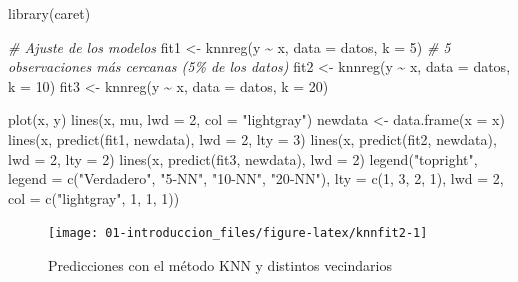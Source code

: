 \documentclass[
]{book}
\newenvironment{Shaded}{\begin{snugshade}}{\end{snugshade}}
\newcommand{\AttributeTok}[1]{\textcolor[rgb]{0.77,0.63,0.00}{#1}}
\newcommand{\CommentTok}[1]{\textcolor[rgb]{0.56,0.35,0.01}{\textit{#1}}}
\newcommand{\DecValTok}[1]{\textcolor[rgb]{0.00,0.00,0.81}{#1}}
\newcommand{\FunctionTok}[1]{\textcolor[rgb]{0.00,0.00,0.00}{#1}}
\newcommand{\NormalTok}[1]{#1}
\newcommand{\OtherTok}[1]{\textcolor[rgb]{0.56,0.35,0.01}{#1}}
\newcommand{\SpecialCharTok}[1]{\textcolor[rgb]{0.00,0.00,0.00}{#1}}
\newcommand{\StringTok}[1]{\textcolor[rgb]{0.31,0.60,0.02}{#1}}
\theoremstyle{break}
\theoremstyle{definition}
\theoremstyle{definition}
\theoremstyle{definition}
\theoremstyle{definition}
\theoremstyle{remark}
\begin{document}
\begin{Shaded}
\begin{Highlighting}[]
\FunctionTok{library}\NormalTok{(caret)}

\CommentTok{\# Ajuste de los modelos}
\NormalTok{fit1 }\OtherTok{\textless{}{-}} \FunctionTok{knnreg}\NormalTok{(y }\SpecialCharTok{\textasciitilde{}}\NormalTok{ x, }\AttributeTok{data =}\NormalTok{ datos, }\AttributeTok{k =} \DecValTok{5}\NormalTok{) }\CommentTok{\# 5 observaciones más cercanas (5\% de los datos)}
\NormalTok{fit2 }\OtherTok{\textless{}{-}} \FunctionTok{knnreg}\NormalTok{(y }\SpecialCharTok{\textasciitilde{}}\NormalTok{ x, }\AttributeTok{data =}\NormalTok{ datos, }\AttributeTok{k =} \DecValTok{10}\NormalTok{)}
\NormalTok{fit3 }\OtherTok{\textless{}{-}} \FunctionTok{knnreg}\NormalTok{(y }\SpecialCharTok{\textasciitilde{}}\NormalTok{ x, }\AttributeTok{data =}\NormalTok{ datos, }\AttributeTok{k =} \DecValTok{20}\NormalTok{)}

\FunctionTok{plot}\NormalTok{(x, y) }
\FunctionTok{lines}\NormalTok{(x, mu, }\AttributeTok{lwd =} \DecValTok{2}\NormalTok{, }\AttributeTok{col =} \StringTok{"lightgray"}\NormalTok{)}
\NormalTok{newdata }\OtherTok{\textless{}{-}} \FunctionTok{data.frame}\NormalTok{(}\AttributeTok{x =}\NormalTok{ x)}
\FunctionTok{lines}\NormalTok{(x, }\FunctionTok{predict}\NormalTok{(fit1, newdata), }\AttributeTok{lwd =} \DecValTok{2}\NormalTok{, }\AttributeTok{lty =} \DecValTok{3}\NormalTok{)}
\FunctionTok{lines}\NormalTok{(x, }\FunctionTok{predict}\NormalTok{(fit2, newdata), }\AttributeTok{lwd =} \DecValTok{2}\NormalTok{, }\AttributeTok{lty =} \DecValTok{2}\NormalTok{)}
\FunctionTok{lines}\NormalTok{(x, }\FunctionTok{predict}\NormalTok{(fit3, newdata), }\AttributeTok{lwd =} \DecValTok{2}\NormalTok{)}
\FunctionTok{legend}\NormalTok{(}\StringTok{"topright"}\NormalTok{, }\AttributeTok{legend =} \FunctionTok{c}\NormalTok{(}\StringTok{"Verdadero"}\NormalTok{, }\StringTok{"5{-}NN"}\NormalTok{, }\StringTok{"10{-}NN"}\NormalTok{, }\StringTok{"20{-}NN"}\NormalTok{), }
       \AttributeTok{lty =} \FunctionTok{c}\NormalTok{(}\DecValTok{1}\NormalTok{, }\DecValTok{3}\NormalTok{, }\DecValTok{2}\NormalTok{, }\DecValTok{1}\NormalTok{), }\AttributeTok{lwd =} \DecValTok{2}\NormalTok{, }\AttributeTok{col =} \FunctionTok{c}\NormalTok{(}\StringTok{"lightgray"}\NormalTok{, }\DecValTok{1}\NormalTok{, }\DecValTok{1}\NormalTok{, }\DecValTok{1}\NormalTok{))}
\end{Highlighting}
\end{Shaded}

\begin{figure}[!htb]

{\centering \texttt{[image: 01-introduccion\_files/figure-latex/knnfit2-1]} 

}

\caption{Predicciones con el método KNN y distintos vecindarios}\label{fig:knnfit2}
\end{figure}
\end{document}
